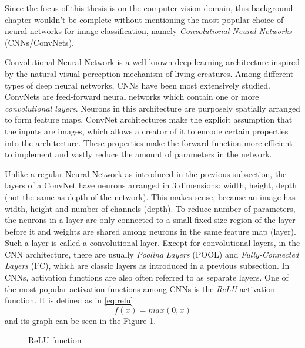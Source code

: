 Since the focus of this thesis is on the computer vision domain, this background chapter wouldn't be complete without mentioning the most popular choice of neural networks for image classification, namely \textit{Convolutional Neural Networks} (CNNs/ConvNets).

Convolutional Neural Network is a well-known deep learning architecture inspired by the natural visual perception mechanism of living creatures. Among different types of deep neural networks, CNNs have been most extensively studied. ConvNets are feed-forward neural networks which contain one or more \textit{convolutional layers}. Neurons in this architecture are purposely spatially arranged to form feature maps. ConvNet architectures make the explicit assumption that the inputs are images, which allows a creator of it to encode certain properties into the architecture. These properties make the forward function more efficient to implement and vastly reduce the amount of parameters in the network.

Unlike a regular Neural Network as introduced in the previous subsection, the layers of a ConvNet have neurons arranged in 3 dimensions: width, height, depth (not the same as depth of the network). This makes sense, because an image has width, height and number of channels (depth). To reduce number of parameters, the neurons in a layer are only connected to a small fixed-size region of the layer before it and weights are shared among neurons in the same feature map (layer). Such a layer is called a convolutional layer. Except for convolutional layers, in the CNN architecture, there are usually \textit{Pooling Layers} (POOL) and \textit{Fully-Connected Layers} (FC), which are classic layers as introduced in a previous subsection. In CNNs, activation functions are also often referred to as separate layers. One of the most popular activation functions among CNNs is the \textit{ReLU} activation function. It is defined as in  \ref{eq:relu}
\begin{equation}\label{eq:relu}
f(x) = max (0, x)
\end{equation}
and its graph can be seen in the Figure \ref{fig:relu}.

\begin{figure}[!ht]
\centering
{}
\caption{ReLU function}
\label{fig:relu}
\end{figure}

